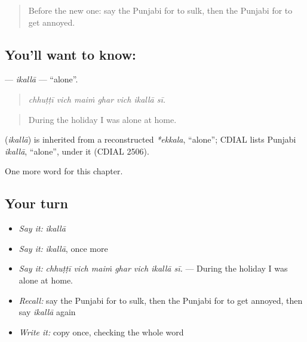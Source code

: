 \label{lesson:PA-C327-ikalla}



\begin{quote}
Before the new one: say the Punjabi for to sulk, then the Punjabi for to get annoyed.
\end{quote}

\subsection*{You'll want to know: }
\textbf{} — \emph{ikallā} — \textquotedblleft{}alone\textquotedblright{}.

\begin{quote}
      
\end{quote}

\begin{quote}
\emph{chhuṭṭī vich maiṁ ghar vich ikallā sī.}
\end{quote}

\begin{quote}
During the holiday I was alone at home.
\end{quote}

\begin{cousinweb}
\textbf{} (\emph{ikallā}) is inherited from a reconstructed \emph{*ekkala}, \textquotedblleft{}alone\textquotedblright{}; CDIAL lists Punjabi \emph{ikallā}, \textquotedblleft{}alone\textquotedblright{}, under it (CDIAL 2506).
\end{cousinweb}

\begin{grammarlens}[title={What you've built}]
One more word for this chapter.
\end{grammarlens}

\subsection*{Your turn}
\begin{itemize}
\raggedright
  \item \emph{Say it:} \emph{ikallā}
  \item \emph{Say it:} \emph{ikallā}, once more
  \item \emph{Say it:} \emph{chhuṭṭī vich maiṁ ghar vich ikallā sī.} — During the holiday I was alone at home.
  \item \emph{Recall:} say the Punjabi for to sulk, then the Punjabi for to get annoyed, then say \emph{ikallā} again
  \item \emph{Write it:} copy \textbf{} once, checking the whole word
\end{itemize}

